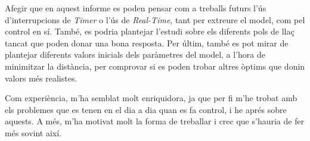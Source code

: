 \documentclass[12pt,a4paper,final,twoside,openright]{report}
\begin{document}
Afegir que en aquest informe es poden pensar com a treballs futurs l'ús d'interrupcions de \textit{Timer} o l'ús de \textit{Real-Time}, tant per extreure el model, com pel control en sí. També, es podria plantejar l'estudi sobre els diferents pols de llaç tancat que poden donar una bona resposta. Per últim, també es pot mirar de plantejar diferents valors inicials dels paràmetres del model, a l'hora de minimitzar la distància, per comprovar si es poden trobar altres òptims que donin valors més realistes.

Com experiència, m'ha semblat molt enriquidora, ja que per fi m'he trobat amb els problemes que es tenen en el dia a dia quan es fa control, i he aprés sobre aquests. A més, m'ha motivat molt la forma de treballar i crec que s'hauria de fer més sovint així.
\end{document}
